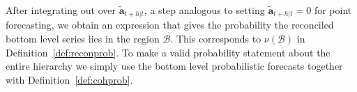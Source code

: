 \documentclass[a4paper, 11pt]{article}
\theoremstyle{theo}
\theoremstyle{definition}
\begin{document}
After integrating out over $\tilde{\bm{a}}_{t+h|t}$, a step analogous to setting $\tilde{\bm{a}}_{t+h|t}=0$ for point forecasting, we obtain an expression that gives the probability the reconciled bottom level series lies in the region $\mathcal{B}$. This corresponds to $\nu(\mathcal{B})$ in Definition~\ref{def:reconprob}.  To make a valid probability statement about the entire hierarchy we simply use the bottom level probabilistic forecasts together with Definition~\ref{def:cohprob}. 


%
\end{document}
